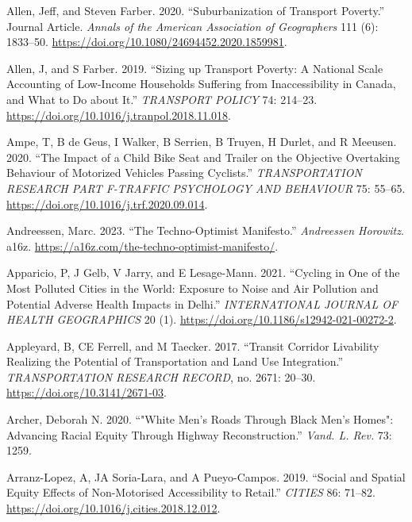 \documentclass[12pt, oneside]{report}
\newlength{\cslhangindent}
\newlength{\cslentryspacingunit} %
\newenvironment{CSLReferences}[2] %
 {%
  \setlength{\parindent}{0pt}
  \ifodd #1
  \let\oldpar\par
  \def\par{\hangindent=\cslhangindent\oldpar}
  \fi
  \setlength{\parskip}{#2\cslentryspacingunit}
 }%
 {}
\begin{document}
\begin{CSLReferences}{1}{0}
\leavevmode{}%
Allen, Jeff, and Steven Farber. 2020. {``Suburbanization of Transport
Poverty.''} Journal Article. \emph{Annals of the American Association of
Geographers} 111 (6): 1833--50.
\url{https://doi.org/10.1080/24694452.2020.1859981}.

\leavevmode{}%
Allen, J, and S Farber. 2019. {``Sizing up Transport Poverty: {A}
National Scale Accounting of Low-Income Households Suffering from
Inaccessibility in {Canada}, and What to Do about It.''} \emph{TRANSPORT
POLICY} 74: 214--23.
\url{https://doi.org/10.1016/j.tranpol.2018.11.018}.

\leavevmode{}%
Ampe, T, B de Geus, I Walker, B Serrien, B Truyen, H Durlet, and R
Meeusen. 2020. {``The Impact of a Child Bike Seat and Trailer on the
Objective Overtaking Behaviour of Motorized Vehicles Passing
Cyclists.''} \emph{TRANSPORTATION RESEARCH PART F-TRAFFIC PSYCHOLOGY AND
BEHAVIOUR} 75: 55--65. \url{https://doi.org/10.1016/j.trf.2020.09.014}.

\leavevmode{}%
Andreessen, Marc. 2023. {``The Techno-Optimist Manifesto.''}
\emph{Andreessen Horowitz}. a16z.
\url{https://a16z.com/the-techno-optimist-manifesto/}.

\leavevmode{}%
Apparicio, P, J Gelb, V Jarry, and E Lesage-Mann. 2021. {``Cycling in
One of the Most Polluted Cities in the World: {Exposure} to Noise and
Air Pollution and Potential Adverse Health Impacts in {Delhi}.''}
\emph{INTERNATIONAL JOURNAL OF HEALTH GEOGRAPHICS} 20 (1).
\url{https://doi.org/10.1186/s12942-021-00272-2}.

\leavevmode{}%
Appleyard, B, CE Ferrell, and M Taecker. 2017. {``Transit {Corridor
Livability Realizing} the {Potential} of {Transportation} and {Land Use
Integration}.''} \emph{TRANSPORTATION RESEARCH RECORD}, no. 2671:
20--30. \url{https://doi.org/10.3141/2671-03}.

\leavevmode{}%
Archer, Deborah N. 2020. {``"White Men's Roads Through Black Men's
Homes": Advancing Racial Equity Through Highway Reconstruction.''}
\emph{Vand. L. Rev.} 73: 1259.

\leavevmode{}%
Arranz-Lopez, A, JA Soria-Lara, and A Pueyo-Campos. 2019. {``Social and
Spatial Equity Effects of Non-Motorised Accessibility to Retail.''}
\emph{CITIES} 86: 71--82.
\url{https://doi.org/10.1016/j.cities.2018.12.012}.


\end{CSLReferences}
\end{document}
